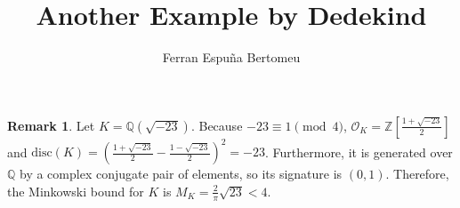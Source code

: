 \documentclass[11pt]{article}
\title{Another Example by Dedekind}
\author{Ferran Espuña Bertomeu}
\theoremstyle{definition}
\newtheorem*{rk}{Remark}
\begin{document}
    \maketitle

    \begin{rk}
        Let $K = \mathbb{Q}\left(\sqrt {-23}\right)$.
        Because $-23 \equiv 1 \pmod 4$, $\mathcal{O}_K = \mathbb{Z}\left[\frac{1+\sqrt {-23}}{2}\right]$
        and
        $\text{disc}(K) = \left(
        \frac{1+\sqrt {-23}}{2} - \frac{1-\sqrt {-23}}{2}
        \right)^2 = -23$.
        Furthermore, it is generated over $\mathbb{Q}$ by a complex conjugate pair of elements, so its signature is $(0,1)$.
        Therefore, the Minkowski bound for $K$ is ${M_K = \frac{2}{\pi}\sqrt{23} < 4}$.
        
    \end{rk}
\end{document}
